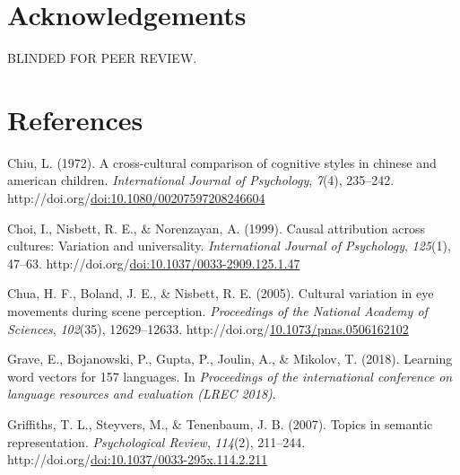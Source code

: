 \documentclass[10pt, letterpaper]{article}
\newenvironment{CSLReferences}%
  {}%
  {\par}
\begin{document}
\hypertarget{acknowledgements}{%
\section{Acknowledgements}\label{acknowledgements}}

BLINDED FOR PEER REVIEW.

\hypertarget{references}{%
\section{References}\label{references}}

\setlength{\parindent}{-0.1in} 
\setlength{\leftskip}{0.125in}

\noindent

\newpage

\hypertarget{refs}{}
\begin{CSLReferences}{1}{0}
\leavevmode{}%
Chiu, L. (1972). A cross-cultural comparison of cognitive styles in
chinese and american children. \emph{International Journal of
Psychology}, \emph{7}(4), 235--242.
http://doi.org/\href{https://doi.org/doi:10.1080/00207597208246604}{doi:10.1080/00207597208246604}

\leavevmode{}%
Choi, I., Nisbett, R. E., \& Norenzayan, A. (1999). Causal attribution
across cultures: Variation and universality. \emph{International Journal
of Psychology}, \emph{125}(1), 47--63.
http://doi.org/\href{https://doi.org/doi:10.1037/0033-2909.125.1.47}{doi:10.1037/0033-2909.125.1.47}

\leavevmode{}%
Chua, H. F., Boland, J. E., \& Nisbett, R. E. (2005). Cultural variation
in eye movements during scene perception. \emph{Proceedings of the
National Academy of Sciences}, \emph{102}(35), 12629--12633.
http://doi.org/\href{https://doi.org/10.1073/pnas.0506162102}{10.1073/pnas.0506162102}

\leavevmode{}%
Grave, E., Bojanowski, P., Gupta, P., Joulin, A., \& Mikolov, T. (2018).
Learning word vectors for 157 languages. In \emph{Proceedings of the
international conference on language resources and evaluation (LREC
2018)}.

\leavevmode{}%
Griffiths, T. L., Steyvers, M., \& Tenenbaum, J. B. (2007). Topics in
semantic representation. \emph{Psychological Review}, \emph{114}(2),
211--244.
http://doi.org/\href{https://doi.org/doi:10.1037/0033-295x.114.2.211}{doi:10.1037/0033-295x.114.2.211}


\end{CSLReferences}
\end{document}
